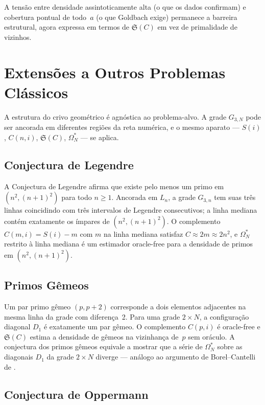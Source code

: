\documentclass[12pt,a4paper]{article}
\theoremstyle{definition}
\theoremstyle{remark}
\newcommand{\Grid}{G_{3,N}}
\newcommand{\Oms}{\Omega^*_N}        %
\newcommand{\Ss}{\mathfrak{S}}       %
\begin{document}
	A tensão entre densidade assintoticamente alta (o que os dados confirmam)
	e cobertura pontual de todo~$a$ (o que Goldbach exige) permanece a barreira
	estrutural, agora expressa em termos de $\Ss(C)$ em vez de primalidade de
	vizinhos.
	
	\section{Extensões a Outros Problemas Clássicos}
	
	A estrutura do crivo geométrico é agnóstica ao problema-alvo.
	A grade $\Grid$ pode ser ancorada em diferentes regiões da reta numérica,
	e o mesmo aparato --- $S(i)$, $C(n,i)$, $\Ss(C)$, $\Oms$ --- se aplica.
	
	\subsection{Conjectura de Legendre}
	
	A Conjectura de Legendre afirma que existe pelo menos um primo em
	$(n^2,(n{+}1)^2)$ para todo $n\geq1$.
	Ancorada em $L_n$, a grade $G_{3,n}$ tem suas três linhas coincidindo com
	três intervalos de Legendre consecutivos; a linha mediana contém exatamente
	os ímpares de $(n^2,(n{+}1)^2)$.
	O complemento $C(m,i)=S(i)-m$ com $m$ na linha mediana satisfaz
	$C\approx2m\approx2n^2$, e $\Oms$ restrito à linha mediana é um estimador
	oracle-free para a densidade de primos em $(n^2,(n{+}1)^2)$.
	
	\subsection{Primos Gêmeos}
	
	Um par primo gêmeo $(p,p{+}2)$ corresponde a dois elementos adjacentes na
	mesma linha da grade com diferença~2.
	Para uma grade $2\times N$, a configuração diagonal $D_1$ é exatamente um
	par gêmeo.
	O complemento $C(p,i)$ é oracle-free e $\Ss(C)$ estima a densidade de
	gêmeos na vizinhança de~$p$ sem oráculo.
	A conjectura dos primos gêmeos equivale a mostrar que a série de $\Oms$
	sobre as diagonais $D_1$ da grade $2\times N$ diverge --- análogo ao
	argumento de Borel--Cantelli de \cite{bandeira2026unif}.
	
	\subsection{Conjectura de Oppermann}
	
\end{document}
